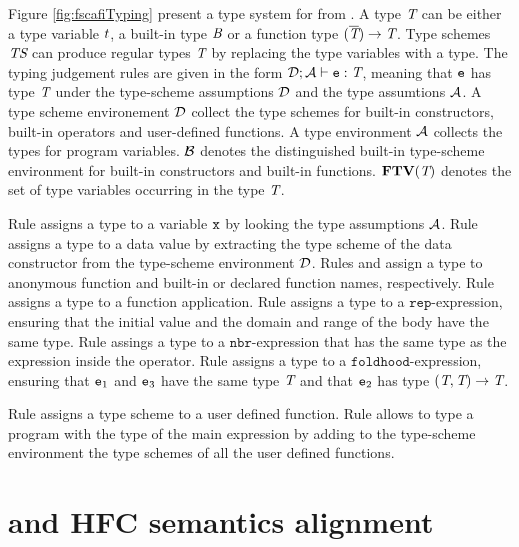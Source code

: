 Figure \ref{fig:fscafiTyping} present a type system for \FSCAFI from \cite{Scafi}. A type $\textit{T}$ can be either a type variable $t$, a built-in type $\textit{B}$ or a function type $(\overline{\textit{T}}) \rightarrow \textit{T}$. Type schemes $\textit{TS}$ can produce regular types $\textit{T}$ by replacing the type variables with a type. The typing judgement rules are given in the form $\mathcal{D} ; \mathcal{A} \vdash \mathtt{e} : \textit{T}$, meaning that $\mathtt{e}$ has type $\textit{T}$ under the type-scheme assumptions $\mathcal{D}$ and the type assumtions $\mathcal{A}$. A type scheme environement $\mathcal{D}$ collect the type schemes for built-in constructors, built-in operators and user-defined functions. A type environment $\mathcal{A}$ collects the types for program variables. $\mathcal{B}$ denotes the distinguished built-in type-scheme environment for built-in constructors and built-in functions. $\textbf{FTV}(\textit{T})$ denotes the set of type variables occurring in the type $\textit{T}$.

Rule  assigns a type to a variable $\mathtt{x}$ by looking the type assumptions $\mathcal{A}$. Rule  assigns a type to a data value by extracting the type scheme of the data constructor from the type-scheme environment $\mathcal{D}$. Rules  and  assign a type to anonymous function and built-in or declared function names, respectively. Rule  assigns a type to a function application. Rule  assigns a type to a $\mathtt{rep}$-expression, ensuring that the initial value and the domain and range of the body have the same type. Rule  assings a type to a $\mathtt{nbr}$-expression that has the same type as the expression inside the operator. Rule  assigns a type to a $\mathtt{foldhood}$-expression, ensuring that $\mathtt{e}_1$ and $\mathtt{e}_3$ have the same type $\textit{T}$ and that $\mathtt{e}_2$ has type $(\textit{T},\textit{T}) \to \textit{T}$.

Rule  assigns a type scheme to a user defined function. Rule  allows to type a program with the type of the main expression by adding to the type-scheme environment the type schemes of all the user defined functions.

\section{\Scafi{} and HFC semantics alignment}

